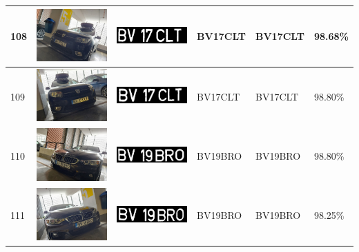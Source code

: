 \documentclass[a4paper,12pt]{report}
\begin{document}
\begin{longtable}{| m{0.6cm} | m{3cm} | m{3cm} | m{1.8cm} | m{1.8cm} | m{1.8cm} |}
    108 & \includegraphics[width=3cm,keepaspectratio]{dataset/63_d1.jpg}  & \includegraphics[width=3cm,keepaspectratio]{segmentari/108.jpg} & BV17CLT             & BV17CLT              & 98.68\%    \\ \hline
    109 & \includegraphics[width=3cm,keepaspectratio]{dataset/63_s1.jpg}  & \includegraphics[width=3cm,keepaspectratio]{segmentari/109.jpg} & BV17CLT             & BV17CLT              & 98.80\%    \\ \hline
    110 & \includegraphics[width=3cm,keepaspectratio]{dataset/64_d1.jpg}  & \includegraphics[width=3cm,keepaspectratio]{segmentari/110.jpg} & BV19BRO             & BV19BRO              & 98.80\%    \\ \hline
    111 & \includegraphics[width=3cm,keepaspectratio]{dataset/64_s1.jpg}  & \includegraphics[width=3cm,keepaspectratio]{segmentari/111.jpg} & BV19BRO             & BV19BRO              & 98.25\%    \\ \hline

\end{longtable}
\end{document}
